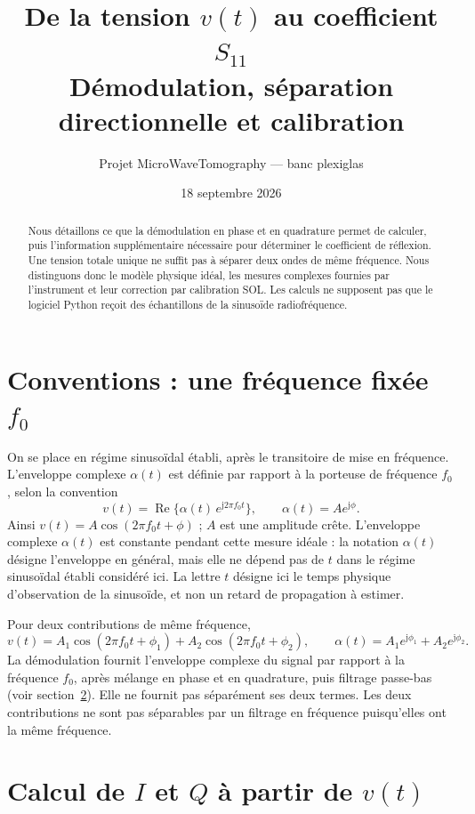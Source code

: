 \documentclass[11pt,a4paper]{article}
\title{De la tension $v(t)$ au coefficient $S_{11}$\\Démodulation, séparation directionnelle et calibration}
\author{Projet MicroWaveTomography --- banc plexiglas}
\date{18 septembre 2026}
\newcommand{\jj}{\mathrm{j}}
\newcommand{\Reel}{\operatorname{Re}}
\begin{document}
\maketitle
\begin{abstract}
Nous détaillons ce que la démodulation en phase et en quadrature permet de
calculer, puis l'information supplémentaire nécessaire pour déterminer
le coefficient de réflexion. Une tension totale unique ne suffit pas à
séparer deux ondes de même fréquence. Nous distinguons donc le modèle
physique idéal, les mesures complexes fournies par l'instrument et leur
correction par calibration SOL. Les calculs ne supposent pas que le logiciel
Python reçoit des échantillons de la sinusoïde radiofréquence.
\end{abstract}

\section{Conventions : une fréquence fixée \texorpdfstring{$f_0$}{f0}}
On se place en régime sinusoïdal établi, après le transitoire de mise en
fréquence. L'enveloppe complexe $\alpha(t)$ est définie par rapport à la
porteuse de fréquence $f_0$, selon la convention
\begin{equation}
 v(t)=\Reel\{\alpha(t)\,e^{\jj2\pi f_0t}\},
 \qquad \alpha(t)=Ae^{\jj\phi}.
\end{equation}
Ainsi $v(t)=A\cos(2\pi f_0t+\phi)$ ; $A$ est une amplitude crête.
L'enveloppe complexe $\alpha(t)$ est constante pendant cette mesure
idéale : la notation $\alpha(t)$ désigne l'enveloppe en général, mais
elle ne dépend pas de $t$ dans le régime sinusoïdal établi considéré ici.
La lettre $t$ désigne ici le temps physique d'observation de la
sinusoïde, et non un retard de propagation à estimer.

Pour deux contributions de même fréquence,
\begin{equation}
 v(t)=A_1\cos(2\pi f_0t+\phi_1)+A_2\cos(2\pi f_0t+\phi_2),
 \qquad
 \alpha(t)=A_1e^{\jj\phi_1}+A_2e^{\jj\phi_2}.
\end{equation}
La démodulation fournit l'enveloppe complexe du signal par rapport à la
fréquence $f_0$, après mélange en phase et en quadrature, puis filtrage
passe-bas (voir section~\ref{s:demod}). Elle ne fournit pas
séparément ses deux termes. Les deux contributions ne sont pas séparables
par un filtrage en fréquence puisqu'elles ont la même fréquence.

\section{Calcul de \texorpdfstring{$I$ et $Q$ à partir de $v(t)$}{I et Q à partir de v(t)}}
\label{s:demod}
\end{document}
